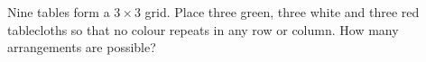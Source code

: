 Nine tables form a $3\times3$ grid. Place three green, three white and three red tablecloths so that no colour repeats in any row or column. How many arrangements are possible?
